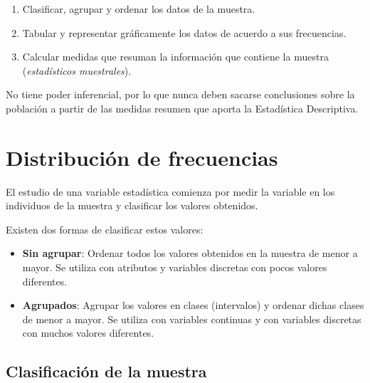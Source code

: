 \documentclass[
  spanish,
  a4paper,
]{scrreport}
\theoremstyle{plain}
\theoremstyle{definition}
\theoremstyle{definition}
\theoremstyle{remark}
\begin{document}
\begin{enumerate}
\def\labelenumi{\arabic{enumi}.}
\item
  Clasificar, agrupar y ordenar los datos de la muestra.
\item
  Tabular y representar gráficamente los datos de acuerdo a sus
  frecuencias.
\item
  Calcular medidas que resuman la información que contiene la muestra
  (\emph{estadísticos muestrales}).
\end{enumerate}

\begin{tcolorbox}[enhanced jigsaw, arc=.35mm, bottomrule=.15mm, bottomtitle=1mm, breakable, colback=white, colbacktitle=quarto-callout-note-color!10!white, colframe=quarto-callout-note-color-frame, coltitle=black, left=2mm, leftrule=.75mm, opacityback=0, opacitybacktitle=0.6, rightrule=.15mm, title=\textcolor{quarto-callout-note-color}{\faInfo}\hspace{0.5em}{Interpretación}, titlerule=0mm, toprule=.15mm, toptitle=1mm]

No tiene poder inferencial, por lo que nunca deben sacarse conclusiones
sobre la población a partir de las medidas resumen que aporta la
Estadística Descriptiva.

\end{tcolorbox}

\section{Distribución de
frecuencias}\label{distribuciuxf3n-de-frecuencias}

El estudio de una variable estadística comienza por medir la variable en
los individuos de la muestra y clasificar los valores obtenidos.

Existen dos formas de clasificar estos valores:

\begin{itemize}
\item
  \textbf{Sin agrupar}: Ordenar todos los valores obtenidos en la
  muestra de menor a mayor. Se utiliza con atributos y variables
  discretas con pocos valores diferentes.
\item
  \textbf{Agrupados}: Agrupar los valores en clases (intervalos) y
  ordenar dichas clases de menor a mayor. Se utiliza con variables
  continuas y con variables discretas con muchos valores diferentes.
\end{itemize}

\subsection{Clasificación de la
muestra}\label{clasificaciuxf3n-de-la-muestra}
\end{document}

